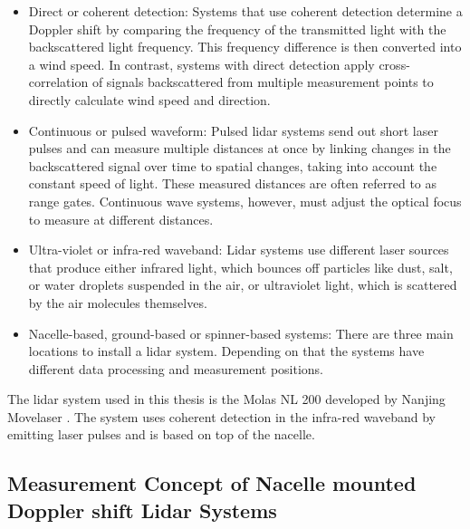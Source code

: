 \begin{itemize}
	\item Direct or coherent detection: Systems that use coherent detection determine a Doppler shift by comparing the frequency of the transmitted light with the backscattered light frequency. This frequency difference is then converted into a wind speed. In contrast, systems with direct detection apply cross-correlation of signals backscattered from multiple measurement points to directly calculate wind speed and direction.
	
	\item Continuous or pulsed waveform: Pulsed lidar systems send out short laser pulses and can measure multiple distances at once by linking changes in the backscattered signal over time to spatial changes, taking into account the constant speed of light. These measured distances are often referred to as range gates. Continuous wave systems, however, must adjust the optical focus to measure at different distances.
	
	\item Ultra-violet or infra-red waveband: Lidar systems use different laser sources that produce either infrared light, which bounces off particles like dust, salt, or water droplets suspended in the air, or ultraviolet light, which is scattered by the air molecules themselves.
	
	\item Nacelle-based, ground-based or spinner-based systems: There are three main locations to install a \gls{lidar} system. Depending on that the systems have different data processing and measurement positions.
\end{itemize}

The \gls{lidar} system used in this thesis is the Molas NL 200 developed by Nanjing Movelaser \cite{MolasNL200}. The system uses coherent detection in the infra-red waveband by emitting laser pulses and is based on top of the nacelle.

\subsection{Measurement Concept of Nacelle mounted Doppler shift Lidar Systems}\label{subsec:LidarInWindConcept}

